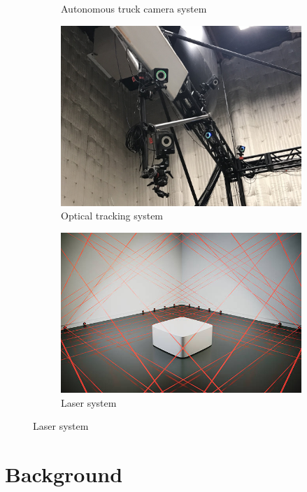 \begin{figure}[ht]
\begin{subfigure}[b]{0.55\textwidth}
        \caption{Autonomous truck camera system} 
        \label{fig:intro_truckcam} 
    \end{subfigure} 
    \begin{subfigure}[b]{0.41\textwidth} 
        \includegraphics[width=\textwidth]{figures/optitrack.jpg} 
        \caption{Optical tracking system} 
        \label{fig:intro_optitrack} 
    \end{subfigure} 
    \begin{subfigure} [b]{0.46\textwidth} 
        \includegraphics[width=\textwidth]{figures/laser.jpg} 
        \caption{Laser system} 
        \label{fig:intro_laser} 
    \end{subfigure} 
\end{figure} 

\section{Background}
